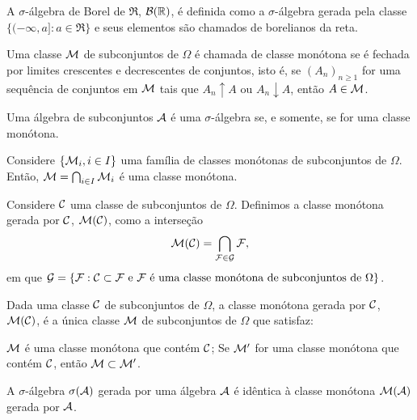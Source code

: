 \begin{definition}
	A $\sigma$-álgebra de Borel de $\Re$, $\mathcal{B}(\mathbb{R})$, é definida como a $\sigma$-álgebra gerada pela classe $\{(-\infty, a] : a \in \Re\}$ e seus elementos são chamados de borelianos da reta.
\end{definition}

\begin{definition}
	Uma classe $\mathcal{M}$ de subconjuntos de $\Omega$ é chamada de classe monótona se é fechada por limites crescentes e decrescentes de conjuntos, isto é, se $(A_n)_{n\geq 1}$ for uma sequência de conjuntos em $\mathcal{M}$ tais que $A_n \uparrow A$ ou $A_n \downarrow A$, então $A \in \mathcal{M}$.
\end{definition}

\begin{theorem}
	Uma álgebra de subconjuntos $\mathcal{A}$ é uma $\sigma$-álgebra se, e somente, se for uma classe monótona.
\end{theorem}

\begin{theorem}
	Considere $\{\mathcal{M}_i, i \in I\}$ uma família de classes monótonas de subconjuntos de $\Omega$. Então, $\mathcal{M} = \bigcap_{i \in I} \mathcal{M}_i$ é uma classe monótona.
\end{theorem}

\begin{definition}
	Considere $\mathcal{C}$ uma classe de subconjuntos de $\Omega$. Definimos a classe monótona gerada por $\mathcal{C}$, $\mathcal{M}(\mathcal{C})$, como a interseção
	\[
	\mathcal{M}(\mathcal{C}) = \bigcap_{\mathcal{F} \in \mathcal{G}} \mathcal{F},
	\]
	em que $\mathcal{G} = \{\mathcal{F} : \mathcal{C} \subset \mathcal{F} \text{ e } \mathcal{F} \text{ é uma classe monótona de subconjuntos de } \Omega\}$.
\end{definition}

\begin{theorem}
	Dada uma classe $\mathcal{C}$ de subconjuntos de $\Omega$, a classe monótona gerada por $\mathcal{C}$, $\mathcal{M}(\mathcal{C})$, é a única classe $\mathcal{M}$ de subconjuntos de $\Omega$ que satisfaz:
	\begin{outline}[enumerate]
		\1 $\mathcal{M}$ é uma classe monótona que contém $\mathcal{C}$;
		\1 Se $\mathcal{M}'$ for uma classe monótona que contém $\mathcal{C}$, então $\mathcal{M} \subset \mathcal{M}'$.
	\end{outline}
\end{theorem}

\begin{theorem}
	A $\sigma$-álgebra $\sigma(\mathcal{A})$ gerada por uma álgebra $\mathcal{A}$ é idêntica à classe monótona $\mathcal{M}(\mathcal{A})$ gerada por $\mathcal{A}$.
\end{theorem}


